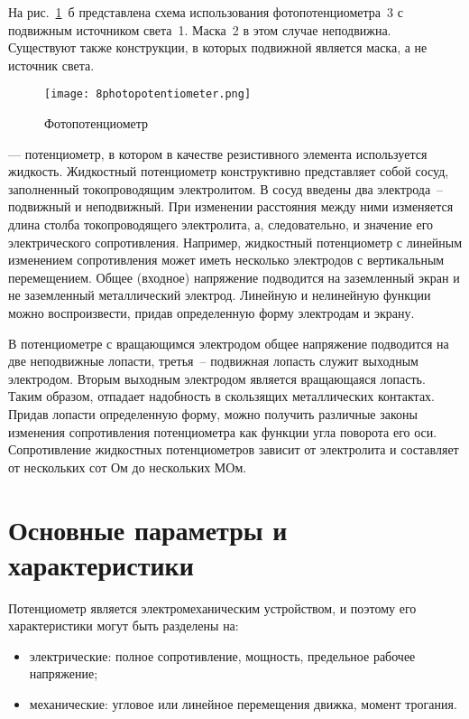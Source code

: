 На рис.~\ref{pic:8photopotentiometer}~б представлена схема использования фотопотенциометра~3 с подвижным источником света~1. Маска~2 в этом случае неподвижна. 
Существуют также конструкции, в которых подвижной является маска, а не источник света.

\begin{figure}[h!]
	\texttt{[image: 8photopotentiometer.png]}
	\caption{ Фотопотенциометр }
	\label{pic:8photopotentiometer}
\end{figure}

 --- потенциометр, в котором в качестве резистивного элемента используется жидкость. 
Жидкостный потенциометр конструктивно представляет собой сосуд, заполненный токопроводящим электролитом. 
В сосуд введены два электрода~-- подвижный и неподвижный. 
При изменении расстояния между ними изменяется длина столба токопроводящего электролита, а, следовательно, и значение его электрического сопротивления.
Например, жидкостный потенциометр с линейным изменением сопротивления может иметь несколько электродов с вертикальным перемещением. 
Общее (входное) напряжение подводится на заземленный экран и не заземленный металлический электрод. 
Линейную и нелинейную функции можно воспроизвести, придав определенную форму электродам и экрану.

В потенциометре с вращающимся электродом общее напряжение подводится на две неподвижные лопасти, третья~-- подвижная лопасть служит выходным электродом. 
Вторым выходным электродом является вращающаяся лопасть. 
Таким образом, отпадает надобность в скользящих металлических контактах. 
Придав лопасти определенную форму, можно получить различные законы изменения сопротивления потенциометра как функции угла поворота его оси. Сопротивление жидкостных потенциометров зависит от электролита и составляет от нескольких сот Ом до нескольких МОм.

\section{Основные параметры и характеристики}

Потенциометр является электромеханическим устройством, и поэтому его характеристики могут быть разделены на:
\begin{itemize}
	\item электрические: полное сопротивление, мощность, предельное рабочее напряжение;
	\item механические: угловое или линейное перемещения движка, момент трогания.
\end{itemize}

